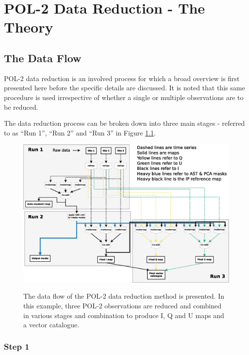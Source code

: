 \chapter{POL-2 Data Reduction - The Theory}
\label{sec:dr}
\section{The Data Flow}

POL-2 data reduction is an involved process for which a broad overview
is first presented here before the specific details are discussed. It
is noted that this same procedure is used irrespective of whether a
single or multiple observations are to be reduced.

The data reduction process can be broken down into three main stages -
referred to as ``Run 1'', ``Run 2'' and ``Run 3'' in Figure
\ref{fig:pol2drflow}.

\begin{figure}[t!]
\begin{center}
\includegraphics[width=1.5\linewidth]{pol2map_flow.eps}
\label{fig:pol2drflow}
\caption [POL-2 Data Flow]{ The data flow of the POL-2 data reduction
  method is presented. In this example, three POL-2 observations are
  reduced and combined in various stages and combination to produce I,
  Q and U maps and a vector catalogue.  }
\end{center}
\end{figure}


\subsection*{Step 1}

